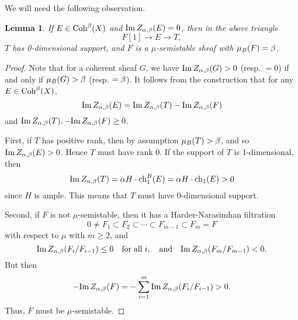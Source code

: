 \documentclass[letterpaper,11pt]{amsart}%
\newtheorem{lem}[thm]{Lemma}
\theoremstyle{remark}
\begin{document}
We will need the following observation. 
\begin{lem}\label{ss-ses}
    If $E \in \mathrm{Coh}^\beta(X)$ and $\mathrm{Im}\, Z_{\alpha,\beta}(E) = 0$, then in the above triangle 
    \[ F[1] \to E \to T, \]
    $T$ has 0-dimensional support, and $F$ is a $\mu$-semistable sheaf with $\mu_B(F) = \beta$.
\end{lem}
\begin{proof}
    Note that for a coherent sheaf $G$, we have $\mathrm{Im}\, Z_{\alpha,\beta}(G) > 0$ (resp. $= 0$) if and only if $\mu_B(G) > \beta$ (resp. $= \beta$). It follows from the construction that for any $E \in \mathrm{Coh}^\beta(X)$,
    \[ \mathrm{Im}\, Z_{\alpha,\beta}(E) = \mathrm{Im}\, Z_{\alpha,\beta}(T) - \mathrm{Im}\, Z_{\alpha,\beta}(F) \]
    and $\mathrm{Im}\, Z_{\alpha,\beta}(T), -\mathrm{Im}\, Z_{\alpha,\beta}(F) \ge 0$. 
    
    First, if $T$ has positive rank, then by assumption $\mu_B(T) > \beta$, and so $\mathrm{Im}\, Z_{\alpha,\beta}(E) > 0$. Hence $T$ must have rank 0. If the support of $T$ is 1-dimensional, then \[ \mathrm{Im}\, Z_{\alpha,\beta}(T) = \alpha H \cdot \operatorname{\mathrm{ch}}^B_1(E) = \alpha H \cdot \operatorname{\mathrm{ch}}_1(E) > 0 \]
    since $H$ is ample. This means that $T$ must have 0-dimensional support.
    
    Second, if $F$ is not $\mu$-semistable, then it has a Harder-Narasimhan filtration
    \[ 0 \neq F_1 \subset F_2 \subset \cdots \subset F_{m-1} \subset F_m = F \]
    with respect to $\mu$ with $m \ge 2$, and 
    \[ \mathrm{Im}\, Z_{\alpha,\beta}(F_i/F_{i-1}) \le 0 \quad \mathrm{for\;all}\; i, \quad \mathrm{and} \quad \mathrm{Im}\, Z_{\alpha,\beta}(F_m/F_{m-1}) < 0. \] 
    But then
    \[ - \mathrm{Im}\, Z_{\alpha,\beta}(F) = - \sum_{i=1}^m \mathrm{Im}\, Z_{\alpha,\beta}(F_i/F_{i-1}) > 0. \]
    Thus, $F$ must be $\mu$-semistable.
\end{proof}
\end{document}
